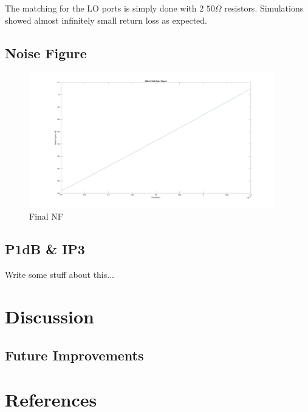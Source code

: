 \documentclass{article}                                                         %
\begin{document}
The matching for the LO ports is simply done with 2 $50 \Omega$ resistors. Simulations
showed almost infinitely small return loss as expected.
\subsection{Noise Figure}
\begin{figure}[H]
  \centering
  \includegraphics[width=0.95\textwidth] {Plots/NF.jpg}
  \caption{Final NF}
    \label{fig:matNF}
\end{figure}

\subsection{P1dB \& IP3}
Write some stuff about this...
\newpage
\section{Discussion}
\subsection{Future Improvements}


\section{References}
\printbibliography[heading=none]
\end{document}
